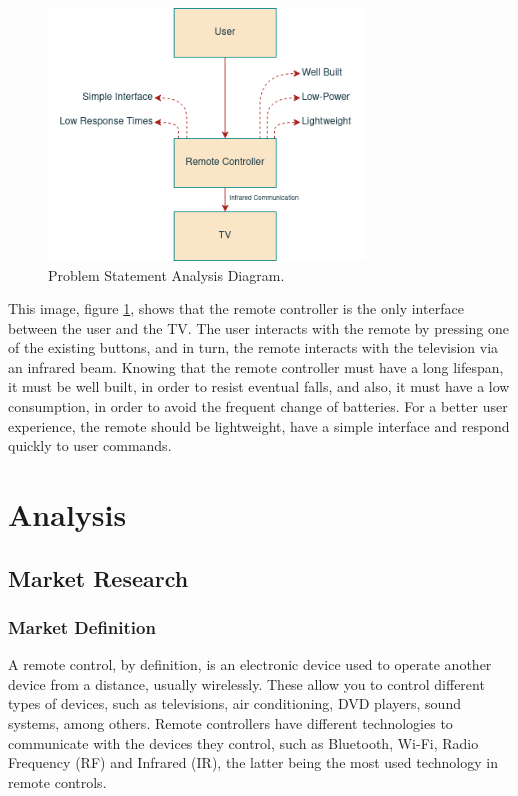 \documentclass[12pt, letterpaper]{report}
\begin{document}
\begin{figure}[ht]
	\centering
	\includegraphics[width=0.75\textwidth]{prob_statement}
	\caption{Problem Statement Analysis Diagram.}
	\label{fig:prob_statement}
\end{figure}

This image, figure \ref{fig:prob_statement}, shows that the remote controller is the only interface between the user and the TV. The user interacts with the remote by pressing one of the existing buttons, and in turn, the remote interacts with the television via an infrared beam. Knowing that the remote controller must have a long lifespan, it must be well built, in order to resist eventual falls, and also, it must have a low consumption, in order to avoid the frequent change of batteries. For a better user experience, the remote should be lightweight, have a simple interface and respond quickly to user commands.

\chapter{Analysis}
\section{Market Research}
\subsection{Market Definition}
A remote control, by definition, is an electronic device used to operate another device from a distance, usually wirelessly. These allow you to control different types of devices, such as televisions, air conditioning, DVD players, sound systems, among others. Remote controllers have different technologies to communicate with the devices they control, such as Bluetooth, Wi-Fi, Radio Frequency (RF) and Infrared (IR), the latter being the most used technology in remote controls.
\end{document}
